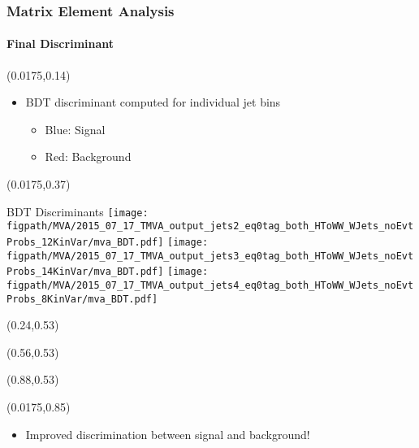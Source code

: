 \begin{frame}
	\frametitle{Matrix Element Analysis}
	\framesubtitle{Final Discriminant}
	\vspace*{-0.24cm}
		\begin{textblock}{0.96}(0.0175,0.14)
			\begin{block}{}
				\begin{itemize}
					\item BDT discriminant computed for individual jet bins
					\begin{itemize}
						\item {\color{blue}Blue: Signal}
						\item {\color{red}Red: Background}
					\end{itemize}
				\end{itemize}
			\end{block}
		\end{textblock}
		\begin{textblock}{0.96}(0.0175,0.37)
			\begin{alertblock}{BDT Discriminants}
				\centering
				\texttt{[image: \\figpath/MVA/2015\_07\_17\_TMVA\_output\_jets2\_eq0tag\_both\_HToWW\_WJets\_noEvtProbs\_12KinVar/mva\_BDT.pdf]}%
				\texttt{[image: \\figpath/MVA/2015\_07\_17\_TMVA\_output\_jets3\_eq0tag\_both\_HToWW\_WJets\_noEvtProbs\_14KinVar/mva\_BDT.pdf]}%
				\texttt{[image: \\figpath/MVA/2015\_07\_17\_TMVA\_output\_jets4\_eq0tag\_both\_HToWW\_WJets\_noEvtProbs\_8KinVar/mva\_BDT.pdf]}%
			\end{alertblock}
		\end{textblock}
		\begin{textblock}{0.15}(0.24,0.53){\color{red}{2 Jets}}\end{textblock}
		\begin{textblock}{0.15}(0.56,0.53){\color{red}{3 Jets}}\end{textblock}
		\begin{textblock}{0.15}(0.88,0.53){\color{red}{$\geq$4 Jets}}\end{textblock}
		\begin{textblock}{0.96}(0.0175,0.85)
			\begin{block}{}
				\begin{itemize}
					\item Improved discrimination between signal and background!
				\end{itemize}
			\end{block}
		\end{textblock}
\end{frame}